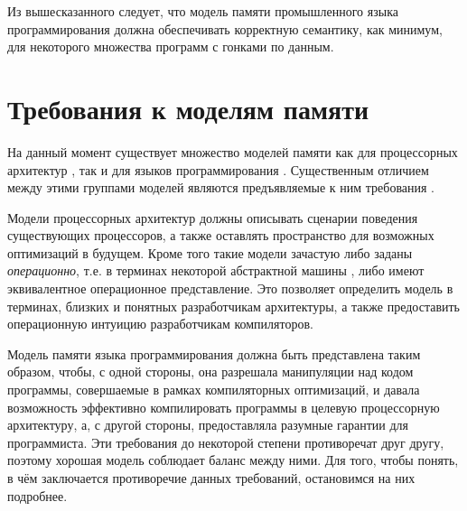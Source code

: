 Из вышесказанного следует, что модель памяти промышленного языка программирования должна обеспечивать корректную семантику,
как минимум, для некоторого множества программ с гонками по данным.

\section{Требования к моделям памяти}
На данный момент существует множество моделей памяти как для процессорных архитектур
\cite{Sewell-al:CACM10,Alglave-al:TOPLAS14,Flur-al:POPL16,Pulte-al:POPL18,Sarkar-al:PLDI11,Kavanagh-Brookes:CoRR17},
так и для языков программирования
\cite{Crary-Sullivan:POPL15,Lamport:TC79,Boudol-al:EXPRESS12,Boudol-Petri:POPL09,PichonPharabod-Sewell:POPL16,Jeffrey-Riely:LICS16,
Nienhuis-al:OOPSLA16,Batty-al:POPL11,Manson-al:POPL05}.
Существенным отличием между этими группами моделей являются предъявляемые к ним требования .

Модели процессорных архитектур должны описывать сценарии поведения существующих процессоров, а также оставлять пространство
для возможных оптимизаций в будущем.
Кроме того такие модели зачастую либо заданы \emph{операционно}, т.е. в терминах некоторой
абстрактной машины \cite{Diehl-al:FGCS00}, либо имеют эквивалентное операционное представление.
Это позволяет определить модель в терминах, близких и понятных разработчикам архитектуры, а также предоставить
операционную интуицию разработчикам компиляторов.

Модель памяти языка программирования должна быть представлена таким образом, чтобы, с одной стороны,
она разрешала манипуляции над кодом программы, совершаемые в рамках компиляторных оптимизаций, и давала возможность
эффективно компилировать программы в целевую процессорную архитектуру, а, с другой стороны, предоставляла
разумные гарантии для программиста.
Эти требования до некоторой степени противоречат друг другу, поэтому хорошая модель
соблюдает баланс между ними.
Для того, чтобы понять, в чём заключается противоречие данных требований, остановимся на них подробнее.

